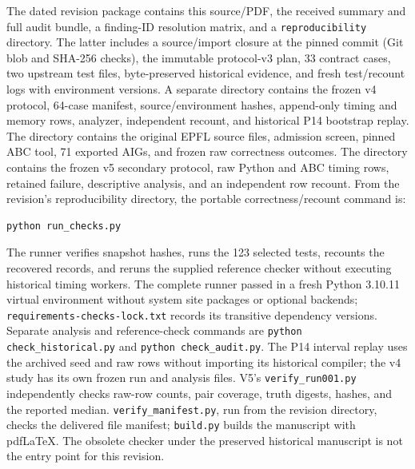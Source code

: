 \documentclass[10pt]{article}
\theoremstyle{plain}
\theoremstyle{definition}
\theoremstyle{remark}
\begin{document}
The dated revision package contains this source/PDF, the received summary and full audit bundle, a finding-ID resolution matrix, and a \texttt{reproducibility} directory. The latter includes a source/import closure at the pinned commit (Git blob and SHA-256 checks), the immutable protocol-v3 plan, 33 contract cases, two upstream test files, byte-preserved historical evidence, and fresh test/recount logs with environment versions. A separate  directory contains the frozen v4 protocol, 64-case manifest, source/environment hashes, append-only timing and memory rows, analyzer, independent recount, and historical P14 bootstrap replay. The  directory contains the original EPFL source files, admission screen, pinned ABC tool, 71 exported AIGs, and frozen raw correctness outcomes. The  directory contains the frozen v5 secondary protocol, raw Python and ABC timing rows, retained failure, descriptive analysis, and an independent row recount. From the revision's reproducibility directory, the portable correctness/recount command is:
\begin{lstlisting}
python run_checks.py
\end{lstlisting}
The runner verifies snapshot hashes, runs the 123 selected tests, recounts the recovered records, and reruns the supplied reference checker without executing historical timing workers. The complete runner passed in a fresh Python 3.10.11 virtual environment without system site packages or optional backends; \texttt{requirements-checks-lock.txt} records its transitive dependency versions. Separate analysis and reference-check commands are \texttt{python check\_historical.py} and \texttt{python check\_audit.py}. The P14 interval replay uses the archived seed and raw rows without importing its historical compiler; the v4 study has its own frozen run and analysis files. V5's \texttt{verify\_run001.py} independently checks raw-row counts, pair coverage, truth digests, hashes, and the reported median. \texttt{verify\_manifest.py}, run from the revision directory, checks the delivered file manifest; \texttt{build.py} builds the manuscript with pdfLaTeX. The obsolete checker under the preserved historical manuscript is not the entry point for this revision.
\end{document}
